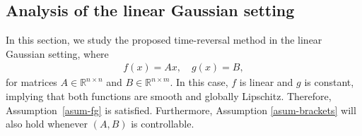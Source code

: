 \documentclass[letterpaper, 10 pt, conference]{ieeeconf}  %
\newcommand{\at}[1]{{\color{blue} #1}}
\def\R{\mathbb{R}}
\def\R{\mathbb{R}}
\begin{document}
\subsection{Analysis of the linear Gaussian setting}\label{sec:lin-gau}
In this section, we study the proposed time-reversal method in the linear Gaussian setting, where
\begin{align*}
    f(x) = Ax,\quad g(x) = B,
\end{align*}
for matrices  $A \in \R^{n\times n}$ and $B \in \R^{n \times m}$. In this case, $f$ is linear and $g$ is constant, implying that both functions are smooth and globally Lipschitz. Therefore, Assumption~\ref{asum-fg} is satisfied. Furthermore, Assumption \ref{asum-brackets} will also hold whenever $(A,B)$ is controllable.
\end{document}
